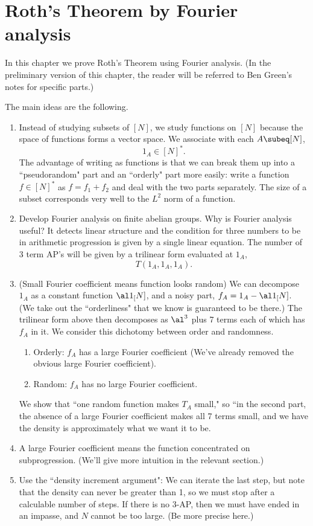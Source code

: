 \chapter{Roth's Theorem by Fourier analysis}

In this chapter we prove Roth's Theorem using Fourier analysis. (In the preliminary version of this chapter, the reader will be referred to Ben Green's notes for specific parts.)

The main ideas are the following. 
\begin{enumerate}
\item
Instead of studying subsets of $[N]$, we study functions on $[N]$ because the space of functions forms a vector space. We associate with each $A\subeq [N]$,
\[
1_A\in [N]^*.
\]
The advantage of writing as functions is that we can break them up into a ``pseudorandom" part and an ``orderly" part more easily: write a function $f\in [N]^*$ as $f=f_1+f_2$ and deal with the two parts separately. The size of a subset corresponds very well to the $L^2$ norm of a function.
\item
Develop Fourier analysis on finite abelian groups. Why is Fourier analysis useful? It detects linear structure and the condition for three numbers to be in arithmetic progression is given by a single linear equation. The number of 3 term AP's will be given by a trilinear form evaluated at $1_A$,
\[
T(1_A,1_A,1_A).
\]
\item (Small Fourier coefficient means function looks random)
We can decompose $1_A$ as a constant function $\al 1_[N]$, and a noisy part, $f_A=1_A-\al 1_[N]$. (We take out the ``orderliness" that we know is guaranteed to be there.) 
The trilinear form above then decomposes as $\al^3$ plus 7 terms each of which has $f_A$ in it. 
We consider this dichotomy between order and randomness.
\begin{enumerate}
\item
Orderly: $f_A$ has a large Fourier coefficient (We've already removed the obvious large Fourier coefficient).
\item
Random: $f_A$ has no large Fourier coefficient.
\end{enumerate}
We show that ``one random function makes $T_A$ small," so ``in the second part, the absence of a large Fourier coefficient makes all 7 terms small, and we have the density is approximately what we want it to be.
\item A large Fourier coefficient means the function concentrated on subprogression. (We'll give more intuition in the relevant section.)
\item Use the ``density increment argument": We can iterate the last step, but note that the density can never be greater than 1, so we must stop after a calculable number of steps. If there is no 3-AP, then we must have ended in an impasse, and $N$ cannot be too large. (Be more precise here.)
\end{enumerate}

